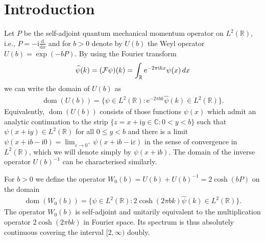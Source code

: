\documentclass[11pt]{article}
\numberwithin{equation}{section}
\numberwithin{equation}{section}
\newcommand{\C}{\mathbb{C}}
\newcommand{\eps}{\varepsilon}
\newcommand{\e}{\mathrm{e}}
\newcommand{\ii}{\mathrm{i}}
\newcommand{\R}{\mathbb{R}}
\DeclareMathOperator{\dom}{dom}
\begin{document}
\section{Introduction}

Let $P$ be the self-adjoint quantum mechanical momentum operator on $L^2(\R)$, i.e., $P=-\ii\frac{\mathrm{d}}{\mathrm{d}x}$ and for $b>0$ denote by $U(b)$ the Weyl operator $U(b)=\exp(-bP)$. By using the Fourier transform
\begin{gather*}
\widehat{\psi}(k)=(\mathcal{F}\psi)(k)=\int_{\R}\e^{-2\pi\ii kx}\psi(x)\,{\rm d} x
\end{gather*}
we can write the domain of $U(b)$ as
\begin{gather*}
\dom(U(b))=\big\{\psi\in L^2(\R)\colon \e^{-2\pi b k}\widehat{\psi}(k)\in L^2(\R)\big\}.
\end{gather*}
Equivalently, $\dom(U(b))$ consists of those functions $\psi(x)$ which admit an analytic continuation to the strip $\{z = x+\ii y\in\C\colon 0<y <b\}$ such that $\psi(x +\ii y) \in L^2(\R)$ for all $0\leq y < b$ and there is a limit $\psi(x +\ii b - \ii 0) = \lim_{\eps\to 0^+}\psi (x + \ii b - \ii\eps)$ in the sense of convergence in $L^2(\R)$, which we will denote simply by $\psi(x+\ii b)$. The domain of the inverse operator $U(b)^{-1}$ can be characterised similarly.

For $b>0$ we define the operator $W_0(b)=U(b)+U(b)^{-1}=2\cosh(bP)$ on the domain
\begin{gather*}
\dom(W_0(b))=\big\{\psi\in L^2(\R)\colon 2\cosh(2\pi bk)\widehat{\psi}(k)\in L^2(\R)\big\}.
\end{gather*}
The operator $W_0(b)$ is self-adjoint and unitarily equivalent to the multiplication operator \linebreak $2\cosh(2\pi b k)$ in Fourier space. Its spectrum is thus absolutely continuous covering the interval
$[2,\infty)$ doubly.
\end{document}

